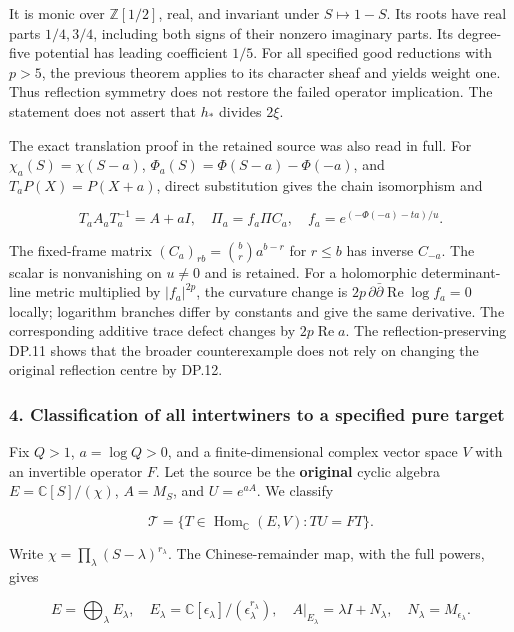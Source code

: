 It is monic over \(\mathbb Z[1/2]\), real, and invariant under \(S\mapsto1-S\). Its roots have real parts \(1/4,3/4\), including both signs of their nonzero imaginary parts. Its degree-five potential has leading coefficient \(1/5\). For all specified good reductions with \(p>5\), the previous theorem applies to its character sheaf and yields weight one. Thus reflection symmetry does not restore the failed operator implication. The statement does not assert that \(h_*\) divides \(2\xi\).

The exact translation proof in the retained source was also read in full. For \(\chi_a(S)=\chi(S-a)\), \(\Phi_a(S)=\Phi(S-a)-\Phi(-a)\), and \(T_aP(X)=P(X+a)\), direct substitution gives the chain isomorphism and

\[
T_aA_aT_a^{-1}=A+aI,
\quad \Pi_a=f_a\Pi C_a,
\quad f_a=e^{(-\Phi(-a)-ta)/u}.
\tag{DP.12}
\]

The fixed-frame matrix \((C_a)_{rb}=\binom br a^{b-r}\) for \(r\le b\) has inverse \(C_{-a}\). The scalar is nonvanishing on \(u\ne0\) and is retained. For a holomorphic determinant-line metric multiplied by \(|f_a|^{2p}\), the curvature change is \(2p\,\partial\bar\partial\operatorname{Re}\log f_a=0\) locally; logarithm branches differ by constants and give the same derivative. The corresponding additive trace defect changes by \(2p\operatorname{Re}a\). The reflection-preserving DP.11 shows that the broader counterexample does not rely on changing the original reflection centre by DP.12.

\subsubsection{4. Classification of all intertwiners to a specified pure target}\label{endpoint-purity_review--classification-of-all-intertwiners-to-a-specified-pure-target}

Fix \(Q>1\), \(a=\log Q>0\), and a finite-dimensional complex vector space \(V\) with an invertible operator \(F\). Let the source be the \textbf{original} cyclic algebra \(E=\mathbb C[S]/(\chi)\), \(A=M_S\), and \(U=e^{aA}\). We classify

\[
\mathscr T=\{T\in\operatorname{Hom}_{\mathbb C}(E,V):TU=FT\}.
\tag{DP.13}
\]

Write \(\chi=\prod_{\lambda}(S-\lambda)^{r_\lambda}\). The Chinese-remainder map, with the full powers, gives

\[
E=\bigoplus_\lambda E_\lambda,
\quad E_\lambda=\mathbb C[\epsilon_\lambda]/(\epsilon_\lambda^{r_\lambda}),
\quad A|_{E_\lambda}=\lambda I+N_\lambda,
\quad N_\lambda=M_{\epsilon_\lambda}.
\tag{DP.14}
\]

